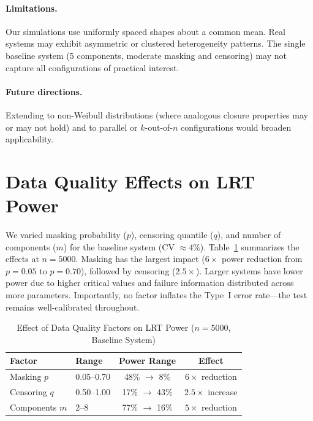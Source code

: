 \documentclass[11pt]{article}
\begin{document}
\paragraph{Limitations.}
Our simulations use uniformly spaced shapes about a common mean. Real systems may exhibit asymmetric or clustered heterogeneity patterns. The single baseline system (5 components, moderate masking and censoring) may not capture all configurations of practical interest.

\paragraph{Future directions.}
Extending to non-Weibull distributions (where analogous closure properties may or may not hold) and to parallel or $k$-out-of-$n$ configurations would broaden applicability.

\appendix

\section{Data Quality Effects on LRT Power}
\label{app:data-quality}

We varied masking probability ($p$), censoring quantile ($q$), and number of components ($m$) for the baseline system (CV $\approx 4\%$). Table~\ref{tab:data-quality} summarizes the effects at $n = 5000$. Masking has the largest impact ($6\times$ power reduction from $p = 0.05$ to $p = 0.70$), followed by censoring ($2.5\times$). Larger systems have lower power due to higher critical values and failure information distributed across more parameters. Importantly, no factor inflates the Type~I error rate---the test remains well-calibrated throughout.

\begin{table}[htbp]
\centering
\caption{Effect of Data Quality Factors on LRT Power ($n = 5000$, Baseline System)}
\label{tab:data-quality}
\small
\begin{tabular}{llcc}
\hline
Factor & Range & Power Range & Effect \\
\hline
Masking $p$ & 0.05--0.70 & 48\% $\to$ 8\% & $6\times$ reduction \\
Censoring $q$ & 0.50--1.00 & 17\% $\to$ 43\% & $2.5\times$ increase \\
Components $m$ & 2--8 & 77\% $\to$ 16\% & $5\times$ reduction \\
\hline
\end{tabular}
\end{table}
\end{document}

